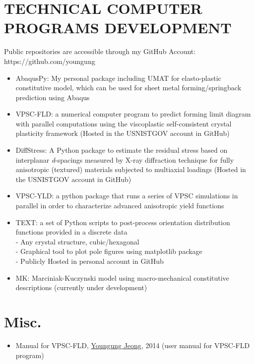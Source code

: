 \documentclass{res}
\begin{document}
\begin{resume}
  \section{TECHNICAL COMPUTER PROGRAMS DEVELOPMENT}
  Public repositories are accessible through my GitHub Account: https://github.com/youngung
  \begin{itemize}
  \item AbaqusPy: My personal package including UMAT for elasto-plastic constitutive model, which can be used for sheet metal forming/springback prediction using Abaqus
  \item VPSC-FLD: a numerical computer program to predict forming limit diagram with parallel computations using the viscoplastic self-consistent crystal plasticity framework (Hosted in the USNISTGOV account in GitHub) \\
  \item DiffStress: A Python package to estimate the residual stress based on interplanar \emph{d}-spacings measured by X-ray diffraction technique for fully anisotropic (textured) materials subjected to multiaxial loadings (Hosted in the USNISTGOV account in GitHub) \\
  \item VPSC-YLD: a python package that runs a series of VPSC simulations in parallel in order to characterize advanced anisotropic yield functions \\
  \item TEXT: a set of Python scripts to post-process orientation distribution functions provided in a discrete data \\
    - Any crystal structure, cubic/hexagonal\\
    - Graphical tool to plot pole figures using matplotlib package\\
    - Publicly Hosted in personal account in GitHub\\
  \item MK: Marciniak-Kuczynski model using macro-mechanical constitutive descriptions (currently under development)
  \end{itemize}

  \section{Misc.}
  \begin{itemize}
  \item Manual for VPSC-FLD, \underline{Youngung Jeong}, 2014 (user manual for VPSC-FLD program)
  \end{itemize}


\end{resume}
\end{document}
